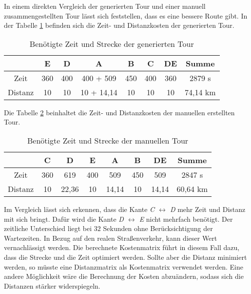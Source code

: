 \noindent
In einem direkten Vergleich der generierten Tour und einer manuell zusammengestellten Tour lässt sich feststellen, dass es eine bessere Route gibt. 
In der Tabelle \ref{tab:genTour} befinden sich die Zeit- und Distanzkosten der generierten Tour. 
\begin{table}[htb]%
\centering%
\begin{tabular}{c|c|c|c|c|c|c|c}
 & E & D & A & B & C & DE & Summe\\ 
\hline 
Zeit & 360 & 400 & 400 + 509 & 450 & 400 & 360 & 2879 s \\
Distanz & 10 & 10 & 10 + 14,14 & 10 & 10 & 10 & 74,14 km \\
\end{tabular} 
\caption{Benötigte Zeit und Strecke der generierten Tour}
\label{tab:genTour}
\end{table}
Die Tabelle \ref{tab:manTour} beinhaltet die Zeit- und Distanzkosten der manuellen erstellten Tour.
\begin{table}[htb]%
\centering%
\begin{tabular}{c|c|c|c|c|c|c|c}
 & C & D & E & A & B & DE & Summe\\ 
\hline 
Zeit & 360 & 619 & 400 & 509 & 450 & 509 & 2847 s \\
Distanz & 10 & 22,36 & 10 & 14,14 & 10 & 14,14 & 60,64 km \\
\end{tabular} 
\caption{Benötigte Zeit und Strecke der manuellen Tour}
\label{tab:manTour}
\end{table}
Im Vergleich lässt sich erkennen, dass die Kante \textit{C $\leftrightarrow$ D} mehr Zeit und Distanz mit sich bringt. 
Dafür wird die Kante \textit{D $\leftrightarrow$ E} nicht mehrfach benötigt. 
Der zeitliche Unterschied liegt bei $32$ Sekunden ohne Berücksichtigung der Wartezeiten. 
In Bezug auf den realen Straßenverkehr, kann dieser Wert vernachlässigt werden. 
Die berechnete Kostenmatrix führt in diesem Fall dazu, dass die Strecke und die Zeit optimiert werden. 
Sollte aber die Distanz minimiert werden, so müsste eine Distanzmatrix als Kostenmatrix verwendet werden. 
Eine andere Möglichkeit wäre die Berechnung der Kosten abzuändern, sodass sich die Distanzen stärker widerspiegeln. 
%


